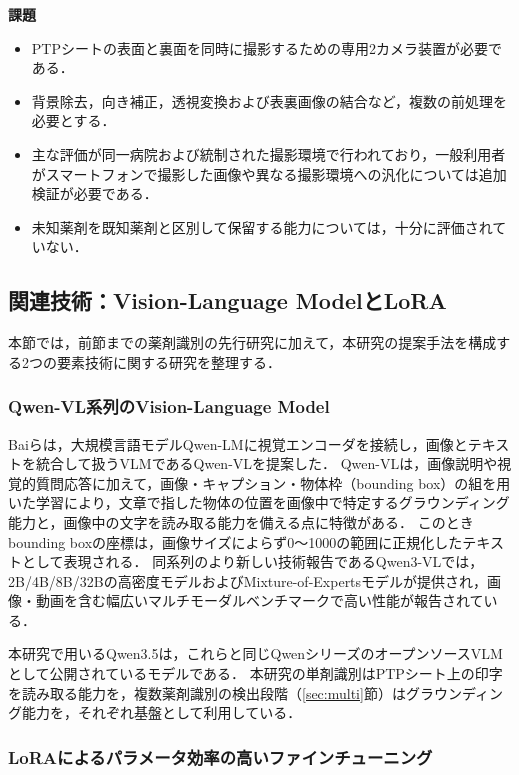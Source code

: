 \documentclass[dvipdfmx]{jsarticle}
\begin{document}
\textbf{課題}
\begin{itemize}
  \item PTPシートの表面と裏面を同時に撮影するための専用2カメラ装置が必要である．
  \item 背景除去，向き補正，透視変換および表裏画像の結合など，複数の前処理を必要とする．
  \item 主な評価が同一病院および統制された撮影環境で行われており，一般利用者がスマートフォンで撮影した画像や異なる撮影環境への汎化については追加検証が必要である．
  \item 未知薬剤を既知薬剤と区別して保留する能力については，十分に評価されていない．
\end{itemize}

\subsection{関連技術：Vision-Language ModelとLoRA}\label{sec:tech}

本節では，前節までの薬剤識別の先行研究に加えて，本研究の提案手法を構成する2つの要素技術に関する研究を整理する．

\subsubsection{Qwen-VL系列のVision-Language Model}

Baiら\cite{bai2023qwenvl}は，大規模言語モデルQwen-LMに視覚エンコーダを接続し，画像とテキストを統合して扱うVLMであるQwen-VLを提案した．
Qwen-VLは，画像説明や視覚的質問応答に加えて，画像・キャプション・物体枠（bounding box）の組を用いた学習により，文章で指した物体の位置を画像中で特定するグラウンディング能力と，画像中の文字を読み取る能力を備える点に特徴がある．
このときbounding boxの座標は，画像サイズによらず0〜1000の範囲に正規化したテキストとして表現される．
同系列のより新しい技術報告であるQwen3-VL\cite{qwen3vl2025}では，2B/4B/8B/32Bの高密度モデルおよびMixture-of-Expertsモデルが提供され，画像・動画を含む幅広いマルチモーダルベンチマークで高い性能が報告されている．

本研究で用いるQwen3.5は，これらと同じQwenシリーズのオープンソースVLMとして公開されているモデルである．
本研究の単剤識別はPTPシート上の印字を読み取る能力を，複数薬剤識別の検出段階（\ref{sec:multi}節）はグラウンディング能力を，それぞれ基盤として利用している．

\subsubsection{LoRAによるパラメータ効率の高いファインチューニング}\label{sec:lora}
\end{document}
